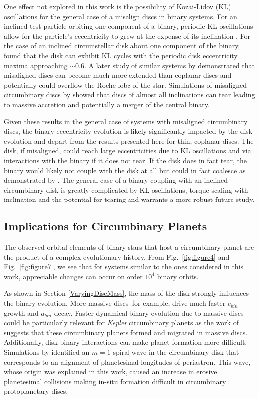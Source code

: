 One effect not explored in this work is the possibility of Kozai-Lidov (KL) oscillations for the general case of a misalign discs in binary systems.   
For an inclined test particle orbiting one component of a binary, periodic KL oscillations 
allow for the particle's eccentricity to grow at the expense of its inclination \citet{Kozai1962,Lidov1962}.  For the case of an inclined circumstellar disk about one 
component of the binary, \citet{Martin14} found that the disk can exhibit KL cycles with the periodic disk eccentricity maxima approaching $\sim 0.6$.  A 
later study of similar systems by \citet{Lubow15} demonstrated that misaligned discs can become much more extended than coplanar discs and 
potentially could overflow the Roche lobe of the star.  Simulations of misaligned circumbinary discs by \citet{Nixon13} showed that discs of almost all 
inclinations can tear leading to massive accretion and potentially a merger of the central binary.

Given these results in the general case of systems with 
misaligned circumbinary discs, the binary eccentricity evolution is likely significantly impacted by the disk evolution and depart from the results presented here 
for thin, coplanar discs.  The disk, if misaligned, could reach large eccentricities due to KL oscillations and via interactions with the binary if it does not tear.  If 
the disk does in fact tear, the binary would likely not couple with the disk at all but could in fact coalesce as demonstrated by \citet{Nixon13}.  The general 
case of a binary coupling with an inclined circumbinary disk is greatly complicated by KL oscillations, torque scaling with inclination and the potential for tearing 
and warrants a more robust future study.

\subsection{Implications for Circumbinary Planets} \label{cbp_implications}

The observed orbital elements of binary stars that host a circumbinary planet are the product of a complex evolutionary history.  From Fig.~\ref{fig:figure4} and 
Fig.~\ref{fig:figure7}, we see that for systems similar to the ones considered in this work, appreciable changes can occur on order $10^4$ binary orbits.  

As shown in Section \ref{VaryingDiscMass}, the mass of the disk strongly influences the binary evolution.  More massive discs, for example, drive much faster 
$e_{bin}$ growth and $a_{bin}$ decay.  Faster dynamical binary evolution due to massive discs could be particularly relevant for {\em Kepler} circumbinary 
planets as the work of \citet{Dunhill2013} suggests that these circumbinary planets formed and migrated in massive discs.  Additionally, disk-binary interactions 
can make planet formation more difficult.  Simulations by \citet{Lines16} identified an $m = 1$ spiral wave in the circumbinary disk that corresponds to an 
alignment of planetesimal longitudes of periastron.  This wave, whose origin was explained in this work, caused an increase in erosive planetesimal 
collisions making in-situ formation difficult in circumbinary protoplanetary discs.

